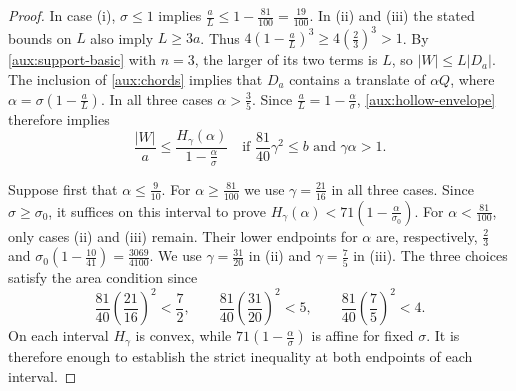 \documentclass[reqno, 11pt]{article}
\numberwithin{equation}{section}
\theoremstyle{definition}
\begin{document}
\begin{proof}
In case (i), $\sigma\le1$ implies
$\frac{a}{L}\le1-\frac{81}{100}=\frac{19}{100}$. In (ii) and (iii)
the stated bounds on $L$ also imply $L\ge3a$. Thus
$4(1-\frac{a}{L})^3\ge4(\frac{2}{3})^3>1$. By \eqref{aux:support-basic}
with $n=3$, the larger of its two terms is $L$, so $|W|\le L|D_a|$.
The inclusion of \cref{aux:chords} implies that $D_a$ contains a
translate of $\alpha Q$, where $\alpha=\sigma(1-\frac{a}{L})$.
In all three cases $\alpha>\frac{3}{5}$. Since
$\frac{a}{L}=1-\frac{\alpha}{\sigma}$, \cref{aux:hollow-envelope}
therefore implies
\[
 \frac{|W|}{a}\le\frac{H_\gamma(\alpha)}{1-\frac{\alpha}{\sigma}}
 \quad\text{if }\frac{81}{40}\gamma^2\le b\text{ and }\gamma\alpha>1.
\]

Suppose first that $\alpha\le\frac{9}{10}$. For
$\alpha\ge\frac{81}{100}$ we use $\gamma=\frac{21}{16}$ in all
three cases. Since $\sigma\ge\sigma_0$, it suffices on this interval
to prove $H_\gamma(\alpha)<71(1-\frac{\alpha}{\sigma_0})$.
For $\alpha<\frac{81}{100}$, only cases (ii) and (iii) remain.
Their lower endpoints for $\alpha$ are, respectively,
$\frac{2}{3}$ and $\sigma_0(1-\frac{10}{41})=\frac{3069}{4100}$.
We use $\gamma=\frac{31}{20}$ in (ii) and $\gamma=\frac{7}{5}$ in
(iii). The three choices satisfy the area condition since
\[
 \frac{81}{40}\left(\frac{21}{16}\right)^2<\frac{7}{2},\qquad
 \frac{81}{40}\left(\frac{31}{20}\right)^2<5,\qquad
 \frac{81}{40}\left(\frac{7}{5}\right)^2<4 .
\]
On each interval $H_\gamma$ is convex, while
$71(1-\frac{\alpha}{\sigma})$ is affine for fixed $\sigma$. It is
therefore enough to establish the strict inequality at both endpoints
of each interval.


\end{proof}
\end{document}
